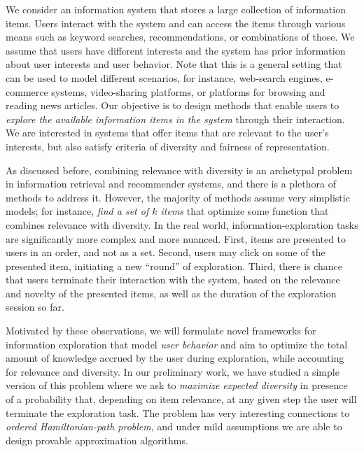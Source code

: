 \documentclass[a4paper,11pt]{article}
\begin{document}
\noindent
\hspace{-3mm}\colorbox{verylightmagenta}{
\begin{minipage}{\textwidth}
\end{minipage}}

\vspace{2mm}
We consider an information system
that stores a large collection of information items.
Users interact with the system and can access the items through various means 
such as keyword searches, recommendations, or combinations of those.
We assume that users have different interests
and the system has prior information about user interests and user behavior.
Note that this is a general setting that can be used to model different scenarios, 
for instance, web-search engines, e-commerce systems, video-sharing platforms, 
or platforms for browsing and reading news articles.
Our objective is to design methods that enable users to 
\emph{explore the available information items in the system} through their interaction.
We are interested in systems that offer items that are relevant to the user's interests, 
but also satisfy criteria of diversity and fairness of representation.

As discussed before, combining relevance with diversity is an archetypal problem
in information retrieval and recommender systems, 
and there is a plethora of methods to address it. 
However, the majority of methods assume very simplistic models;
for instance, \emph{find a set of $k$ items} 
that optimize some function that combines relevance with diversity. 
In the real world, information-exploration tasks are significantly more complex and more nuanced. 
First, items are presented to users in an order, and not as a set.
Second, users may click on some of the presented item, 
initiating a new ``round'' of exploration. 
Third, there is chance that users terminate their interaction with the system, 
based on the relevance and novelty of the presented items,
as well as the duration of the exploration session so far.

Motivated by these observations, 
we will formulate novel frameworks for information exploration
that model \emph{user behavior} and aim to optimize 
the total amount of knowledge accrued by the user during exploration, 
while accounting for relevance and diversity.
In our preliminary work, we have studied a simple version 
of this problem where we ask to \emph{maximize expected diversity} 
in presence of a probability that, depending on item relevance,  
at any given step the user will terminate the exploration task. 
The problem has very interesting connections to \emph{ordered Hamiltonian-path problem}, 
and under mild assumptions we are able to design provable approximation algorithms.
\end{document}
